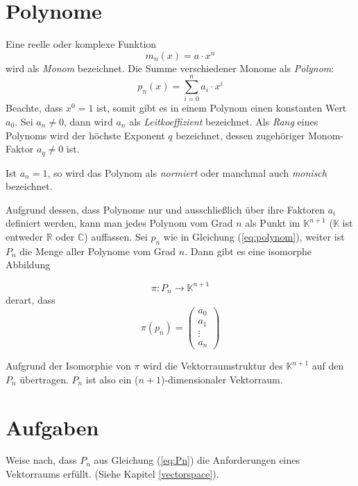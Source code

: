 \section{Polynome}\label{chap:poly}

\begin{definition}
Eine reelle oder komplexe Funktion
\[ m_n(x) = a\cdot x^n  \]
wird als \emph{Monom} bezeichnet. Die Summe verschiedener Monome als \emph{Polynom}:
\begin{equation}\label{eq:polynom}
p_n(x) = \sum_{i=0}^{n} a_i \cdot x^i
\end{equation}
Beachte, dass $x^0 = 1$ ist, somit gibt es in einem Polynom einen konstanten Wert $a_0$. Sei $a_n\ne 0$, dann wird $a_n$ als \emph{Leitkoeffizient} bezeichnet. Als \emph{Rang} eines Polynoms wird der höchste Exponent $q$ bezeichnet, dessen zugehöriger Monom-Faktor $a_q \ne 0$ ist.

Ist $a_n = 1$, so wird das Polynom als \emph{normiert} oder manchmal auch \emph{monisch} bezeichnet.
\end{definition}

Aufgrund dessen, dass Polynome nur und ausschließlich über ihre Faktoren $a_i$ definiert werden, kann man jedes Polynom vom Grad $n$ als Punkt im $\mathbb{K}^{n+1}$ ($\mathbb{K}$ ist entweder $\mathbb{R}$ oder $\mathbb{C}$) auffassen. Sei $p_n$ wie in Gleichung (\ref{eq:polynom}), weiter ist $P_n$ die Menge aller Polynome vom Grad $n$. Dann gibt es eine isomorphe Abbildung 

\begin{equation}\label{eq:Pn}
\pi : P_n \longrightarrow \mathbb{K}^{n+1}
\end{equation}
derart, dass
\begin{equation}
\pi\left(p_n\right) = \begin{pmatrix}
a_0\\
a_1\\
\vdots\\
a_n
\end{pmatrix}
\end{equation}

Aufgrund der Isomorphie von $\pi$ wird die Vektorraumstruktur des $\mathbb{K}^{n+1}$ auf den $P_n$ übertragen. $P_n$ ist also ein ($n+1$)-dimensionaler Vektorraum.




\section{Aufgaben}

\begin{prob}
\label{poly.1.1}
Weise nach, dass $P_n$ aus Gleichung (\ref{eq:Pn}) die Anforderungen eines Vektorraums erfüllt. (Siehe Kapitel \ref{vectorspace}).
\end{prob}